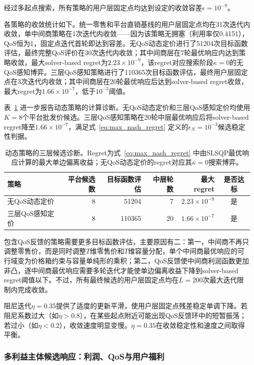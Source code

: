 \documentclass[UTF8,11pt]{ctexart}
\begin{document}
经过多起点搜索，所有策略的用户层固定点均达到设定的收敛容差$\epsilon=10^{-9}$。

各策略的收敛统计如下。统一零售和平台直销基线的用户层固定点均在31次迭代内收敛，单中间商策略在1次迭代内收敛——因为该策略无拥塞（利用率仅0.4151），QoS恒为1，固定点迭代首轮即达到容差。无QoS动态定价进行了51204次目标函数评估，最终完整QoS评价在30次迭代内收敛；其中间商层在7轮最优响应内达到策略收敛，最大solver-based regret为$2.23\times10^{-9}$，该regret对应搜索阶段$\kappa=0$的无QoS感知博弈。三层QoS感知策略进行了110365次目标函数评估，最终用户层固定点在3次迭代内收敛；其中间商层在20轮最优响应后达到solver-based regret收敛，最大regret为$1.66\times10^{-7}$，低于$10^{-3}$阈值。

表~\ref{tab:equilibrium_diagnostics} 进一步报告动态策略的计算诊断。无QoS动态定价和三层QoS感知定价均使用$K=8$个平台批发价候选。三层QoS感知策略在20轮中层最优响应后将solver-based regret降至$1.66\times10^{-7}$，满足式~\eqref{eq:max_nash_regret} 定义的$\epsilon_N=10^{-3}$候选稳定性判据。

\begin{table}[H]
\centering
\caption{动态策略的三层候选诊断。Regret为式~\eqref{eq:max_nash_regret} 中由SLSQP最优响应计算的最大单边偏离收益；无QoS动态定价的regret对应其$\kappa=0$搜索博弈。}
\label{tab:equilibrium_diagnostics}
\begin{tabular}{lrrrrc}
\toprule
策略 & 平台候选数 & 目标函数评估 & 中层轮数 & 最大regret & 是否达标 \\
\midrule
无QoS动态定价 & 8 & 51204 & 7  & $2.23\times10^{-9}$ & 是 \\
三层QoS感知定价 & 8 & 110365 & 20 & $1.66\times10^{-7}$  & 是 \\
\bottomrule
\end{tabular}
\end{table}

包含QoS反馈的策略需要更多目标函数评估，主要原因有二：第一，中间商不再只调整零售价，而是同时调整$T$维零售价和$T$维容量分配，单个中间商最优响应的可行域变为价格箱约束与容量单纯形的乘积；第二，QoS反馈使中间商利润函数更加非凸，逐中间商最优响应需要多轮迭代才能使单边偏离收益下降到solver-based regret阈值以下。不过，所有最终候选的用户层固定点均在$L=200$次最大迭代限制内完成收敛。

阻尼迭代$\eta=0.35$提供了适度的更新平滑，使用户层固定点残差稳定单调下降。若阻尼系数过大（如$\eta>0.8$），在某些起点附近可能出现QoS反馈环中的短暂振荡；若过小（如$\eta<0.2$），收敛速度明显变慢。$\eta=0.35$在收敛稳定性和速度之间取得平衡。

\subsubsection{多利益主体候选响应：利润、QoS与用户福利}
\label{sec:equilibrium_results}
\end{document}
